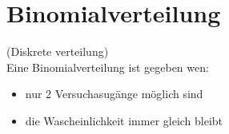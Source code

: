 \newpage
\section{Binomialverteilung}
 (Diskrete verteilung)\\

Eine Binomialverteilung ist gegeben wen:
\begin{itemize}
    \item nur 2 Versuchasugänge möglich sind
    \item die Wascheinlichkeit immer gleich bleibt
\end{itemize}

\hfill \break


\hfill \break

